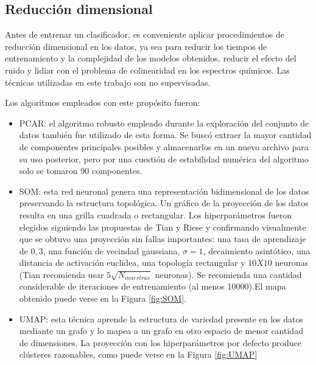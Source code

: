 \documentclass[12pt]{article}
\begin{document}


\subsection{Reducción dimensional}

Antes de entrenar un clasificador, es conveniente aplicar procedimientos de reducción dimensional en los datos, ya sea para reducir los tiempos de entrenamiento y la complejidad de los modelos obtenidos, reducir el efecto del ruido y lidiar con el problema de colinearidad en los espectros químicos. Las técnicas utilizadas en este trabajo son no supervisadas.

Los algoritmos empleados con este propósito fueron:

\begin{itemize}
  \item PCAR: el algoritmo robusto empleado durante la exploración del conjunto de datos también fue utilizado de esta forma. Se buscó extraer la mayor cantidad de componentes principales posibles y almacenarlos en un nuevo archivo para su uso posterior, pero por una cuestión de estabilidad numérica del algoritmo solo se tomaron 90 componentes.
  \item SOM: esta red neuronal genera una representación bidimensional de los datos preservando la estructura topológica. Un gráfico de la proyección de los datos resulta en una grilla cuadrada o rectangular. Los hiperparámetros fueron elegidos siguiendo las propuestas de Tian\cite{Tian2014} y Riese\cite{SuSi} y confirmando visualmente que se obtuvo una proyección sin fallas importantes: una tasa de aprendizaje de $0,3$, una función de vecindad gaussiana, $\sigma = 1$, decaimiento asintótico, una distancia de activación euclidea, una topología rectangular y $10X10$ neuronas (Tian recomienda usar $5 \sqrt{N_{muestras}}$ neuronas). Se recomienda una cantidad considerable de iteraciones de entrenamiento (al menos 10000).El mapa obtenido puede verse en la Figura \ref{fig:SOM}.
  \item UMAP: esta técnica aprende la estructura de variedad presente en los datos mediante un grafo y lo mapea a un grafo en otro espacio de menor cantidad de dimensiones. La proyección con los hiperparámetros por defecto produce clústeres razonables, como puede verse en la Figura \ref{fig:UMAP}
\end{itemize}
\end{document}
